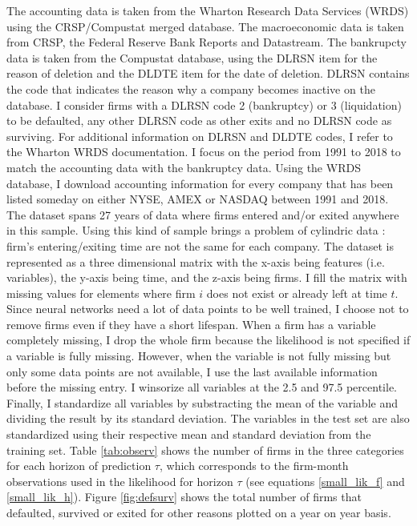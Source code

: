 The accounting data is taken from the Wharton Research Data Services (WRDS) using the CRSP/Compustat merged database. The macroeconomic data is taken from CRSP, the Federal Reserve Bank Reports and Datastream. The bankrupcty data is taken from the Compustat database, using the DLRSN item for the reason of deletion and the DLDTE item for the date of deletion. DLRSN contains the code that indicates the reason why a company becomes inactive on the database. I consider firms with a DLRSN code 2 (bankruptcy) or 3 (liquidation) to be defaulted, any other DLRSN code as other exits and no DLRSN code as surviving. For additional information on DLRSN and DLDTE codes, I refer to the Wharton WRDS documentation. I focus on the period from 1991 to 2018 to match the accounting data with the bankruptcy data. Using the WRDS database, I download accounting information for every company that has been listed someday on either NYSE, AMEX or NASDAQ between 1991 and 2018. The dataset spans 27 years of data where firms entered and/or exited anywhere in this sample. Using this kind of sample brings a problem of cylindric data : firm's entering/exiting time are not the same for each company. The dataset is represented as a three dimensional matrix with the x-axis being features (i.e. variables), the y-axis being time, and the z-axis being firms. I fill the matrix with missing values for elements where firm $i$ does not exist or already left at time $t$. 
Since neural networks need a lot of data points to be well trained, I choose not to remove firms even if they have a short lifespan. When a firm has a variable completely missing, I drop the whole firm because the likelihood is not specified if a variable is fully missing. However, when the variable is not fully missing but only some data points are not available, I use the last available information before the missing entry. I winsorize all variables at the 2.5 and 97.5 percentile. 
Finally, I standardize all variables by substracting the mean of the variable and dividing the result by its standard deviation. The variables in the test set are also standardized using their respective mean and standard deviation from the training set. Table \ref{tab:observ} shows the number of firms in the three categories for each horizon of prediction $\tau$, which corresponds to the firm-month observations used in the likelihood for horizon $\tau$ (see equations \ref{small_lik_f} and \ref{small_lik_h}). Figure \ref{fig:defsurv} shows the total number of firms that defaulted, survived or exited for other reasons plotted on a year on year basis.

